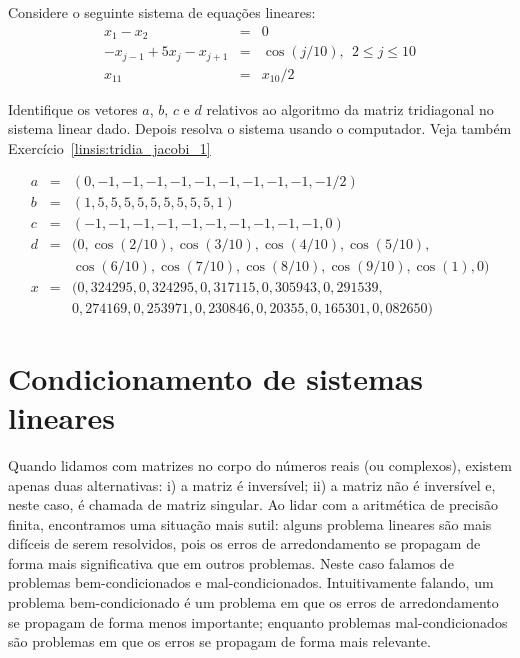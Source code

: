 \begin{exer}\label{linsis:tridia_jacobi_2} Considere o seguinte sistema de equações lineares:
\begin{eqnarray}
x_1-x_2&=&0\nonumber\\
-x_{j-1}+5x_j-x_{j+1}&=&\cos(j/10),~~ 2\leq j \leq 10\nonumber\\
x_{11}&=&x_{10}/2
\end{eqnarray}

Identifique os vetores $a$, $b$, $c$ e $d$  relativos ao algoritmo da matriz tridiagonal no sistema linear dado.  Depois resolva o sistema usando o computador. Veja também Exercício~\ref{linsis:tridia_jacobi_1}
 \end{exer}
\begin{resp}
 \begin{eqnarray}
  a &=& (0, -1, -1, -1, -1, -1, -1, -1, -1, -1, -1/2)\\
  b &=& (1,  5,  5,  5,  5,  5,  5,  5,  5,  5,  1)\\
  c &=& (-1, -1, -1, -1, -1, -1, -1, -1, -1, -1, 0)\\
  d &=& (0, \cos(2/10), \cos(3/10), \cos(4/10), \cos(5/10),\\&& \cos(6/10), \cos(7/10), \cos(8/10), \cos(9/10), \cos(1) ,0)\\
  x &=& (0,324295, 0,324295, 0,317115, 0,305943, 0,291539,\\&& 0,274169, 0,253971, 0,230846, 0,20355, 0,165301, 0,082650)
 \end{eqnarray}
\end{resp}



\section{Condicionamento de sistemas lineares}

Quando lidamos com matrizes no corpo do números reais (ou complexos), existem apenas duas alternativas: i) a matriz é inversível; ii) a matriz não é inversível e, neste caso, é chamada de matriz singular. Ao lidar com a aritmética de precisão finita, encontramos uma situação mais sutil: alguns problema lineares são mais difíceis de serem resolvidos, pois os erros de arredondamento se propagam de forma mais significativa que em outros problemas. Neste caso falamos de problemas bem-condicionados e mal-condicionados. Intuitivamente falando, um problema bem-condicionado é um problema em que os erros de arredondamento se propagam de forma menos importante; enquanto problemas mal-condicionados são problemas em que os erros se propagam de forma mais relevante.

